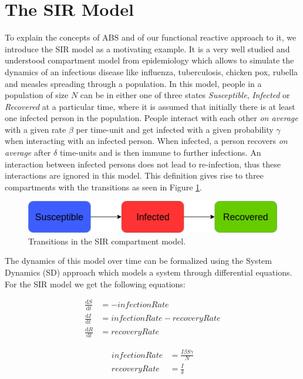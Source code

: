 \section{The SIR Model}
To explain the concepts of ABS and of our functional reactive approach to it, we introduce the SIR model as a motivating example. It is a very well studied and understood compartment model from epidemiology \cite{kermack_contribution_1927} which allows to simulate the dynamics of an infectious disease like influenza, tuberculosis, chicken pox, rubella and measles \cite{enns_its_2010} spreading through a population. In this model, people in a population of size $N$ can be in either one of three states \textit{Susceptible}, \textit{Infected} or \textit{Recovered} at a particular time, where it is assumed that initially there is at least one infected person in the population. People interact with each other \textit{on average} with a given rate $\beta$ per time-unit and get infected with a given probability $\gamma$ when interacting with an infected person. When infected, a person recovers \textit{on average} after $\delta$ time-units and is then immune to further infections. An interaction between infected persons does not lead to re-infection, thus these interactions are ignored in this model. This definition gives rise to three compartments with the transitions as seen in Figure \ref{fig:sir_transitions}.

\begin{figure}
	\centering
	\includegraphics[width=.4\textwidth, angle=0]{./../shared/fig/diagrams/SIR_transitions.png}
	\caption{Transitions in the SIR compartment model.}
	\label{fig:sir_transitions}
\end{figure}

The dynamics of this model over time can be formalized using the System Dynamics (SD) approach \cite{porter_industrial_1962} which models a system through differential equations. For the SIR model we get the following equations:

\begin{align}
\frac{\mathrm d S}{\mathrm d t} &= -infectionRate \\ 
\frac{\mathrm d I}{\mathrm d t} &= infectionRate - recoveryRate \\ 
\frac{\mathrm d R}{\mathrm d t} &= recoveryRate 
\end{align}

\begin{align}
infectionRate &= \frac{I \beta S \gamma}{N} \\
recoveryRate &= \frac{I}{\delta} 
\end{align}

